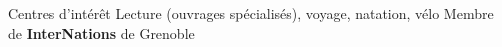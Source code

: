 \begin{rubric}{Centres d’intérêt}
\entry*[Loisirs] Lecture (ouvrages spécialisés), voyage, natation, vélo %
 Membre de \textbf{InterNations} de Grenoble
\end{rubric}

